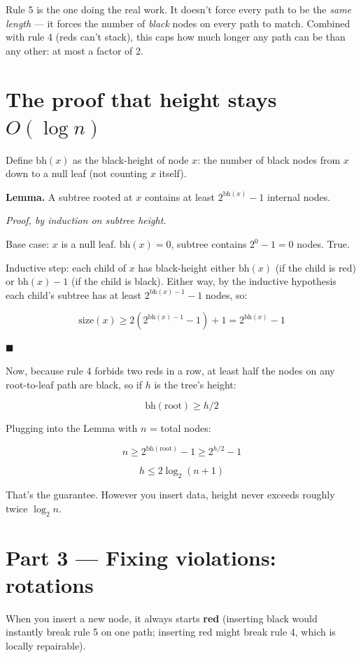 \documentclass[11pt,a4paper]{article}
\begin{document}
Rule 5 is the one doing the real work. It doesn't force every path to be the \emph{same length} --- it forces the number of \emph{black} nodes on every path to match. Combined with rule 4 (reds can't stack), this caps how much longer any path can be than any other: at most a factor of 2.

\section{The proof that height stays $O(\log n)$}

Define $\text{bh}(x)$ as the black-height of node $x$: the number of black nodes from $x$ down to a null leaf (not counting $x$ itself).

\textbf{Lemma.} A subtree rooted at $x$ contains at least $2^{\text{bh}(x)} - 1$ internal nodes.

\emph{Proof, by induction on subtree height.}

Base case: $x$ is a null leaf. $\text{bh}(x) = 0$, subtree contains $2^0 - 1 = 0$ nodes. True.

Inductive step: each child of $x$ has black-height either $\text{bh}(x)$ (if the child is red) or $\text{bh}(x) - 1$ (if the child is black). Either way, by the inductive hypothesis each child's subtree has at least $2^{\text{bh}(x)-1} - 1$ nodes, so:


\[
\text{size}(x) \ge 2\left(2^{\text{bh}(x)-1} - 1\right) + 1 = 2^{\text{bh}(x)} - 1
\]


$\blacksquare$

Now, because rule 4 forbids two reds in a row, at least half the nodes on any root-to-leaf path are black, so if $h$ is the tree's height:


\[
\text{bh}(\text{root}) \ge h/2
\]


Plugging into the Lemma with $n$ = total nodes:


\[
n \ge 2^{\text{bh}(\text{root})} - 1 \ge 2^{h/2} - 1
\]



\[
h \le 2\log_2(n+1)
\]


That's the guarantee. However you insert data, height never exceeds roughly twice $\log_2 n$.

\section{Part 3 --- Fixing violations: rotations}

When you insert a new node, it always starts \textbf{red} (inserting black would instantly break rule 5 on one path; inserting red might break rule 4, which is locally repairable).
\end{document}
